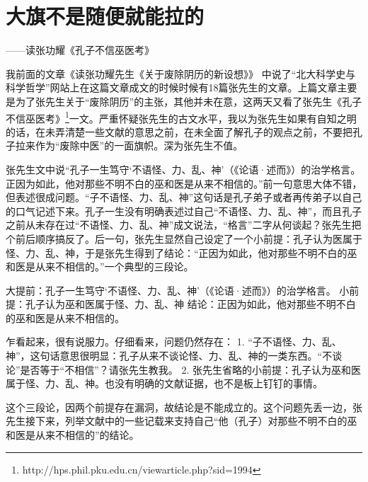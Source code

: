 \section{大旗不是随便就能拉的}
\centerline{
	\yuesong ——读张功耀《孔子不信巫医考》
}

\mbox{}

我前面的文章《读张功耀先生《关于废除阴历的新设想》》 中说了“北大科学史与科学哲学”网站上在这篇文章成文的时候时候有18篇张先生的文章。上篇文章主要是为了张先生关于“废除阴历”的主张，其他并未在意，这两天又看了张先生《孔子不信巫医考》\footnote{http://hps.phil.pku.edu.cn/viewarticle.php?sid=1994}一文。严重怀疑张先生的古文水平，我以为张先生如果有自知之明的话，在未弄清楚一些文献的意思之前，在未全面了解孔子的观点之前，不要把孔子拉来作为“废除中医”的一面旗帜。深为张先生不值。

张先生文中说“孔子一生笃守‘不语怪、力、乱、神’（《论语·述而》）的治学格言。正因为如此，他对那些不明不白的巫和医是从来不相信的。”前一句意思大体不错，但表述很成问题。“子不语怪、力、乱、神”这句话是孔子弟子或者再传弟子以自己的口气记述下来。孔子一生没有明确表述过自己“不语怪、力、乱、神”，而且孔子之前从未存在过“不语怪、力、乱、神”成文说法，“格言”二字从何谈起？张先生把个前后顺序搞反了。后一句，张先生显然自己设定了一个小前提：孔子认为医属于怪、力、乱、神，于是张先生得到了结论：“正因为如此，他对那些不明不白的巫和医是从来不相信的。”一个典型的三段论。

大提前：孔子一生笃守‘不语怪、力、乱、神’（《论语·述而》）的治学格言。
小前提：孔子认为巫和医属于怪、力、乱、神
结论：正因为如此，他对那些不明不白的巫和医是从来不相信的。

乍看起来，很有说服力。仔细看来，问题仍然存在：
1.  “子不语怪、力、乱、神”，这句话意思很明显：孔子从来不谈论怪、力、乱、神的一类东西。“不谈论”是否等于“不相信”？请张先生教我。
2.  张先生省略的小前提：孔子认为巫和医属于怪、力、乱、神。也没有明确的文献证据，也不是板上钉钉的事情。

这个三段论，因两个前提存在漏洞，故结论是不能成立的。这个问题先丢一边，张先生接下来，列举文献中的一些记载来支持自己“他（孔子）对那些不明不白的巫和医是从来不相信的”的结论。

